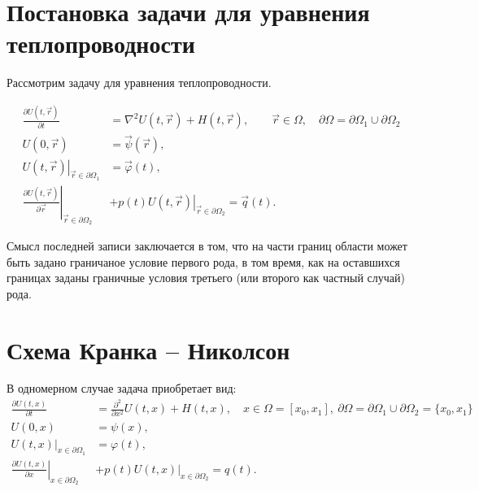 \documentclass[a4paper,12pt]{article}
\begin{document}
\renewcommand{\contentsname}{Содержание}
\renewcommand{\figurename}{Рис.}
\renewcommand{\bibname}{Список литературы}
\renewcommand{\refname}{Список литературы}
\renewcommand{\tablename}{Таблица}

\section{Постановка задачи для уравнения теплопроводности}
\label{sec:problem}

Рассмотрим задачу для уравнения теплопроводности.

\begin{align}
  \frac{\partial U(t,\vec r)}{\partial t} &= \nabla^2 U(t,\vec r) + H(t, \vec r),
    \qquad \vec r \in \Omega,
    \quad \partial \Omega = \partial \Omega_1 \cup \partial \Omega_2 \\
  U(0, \vec r) &=  \vec \psi (\vec r), \\
  \left. U(t,\vec r) \right|_{\vec r \in \partial \Omega_1} &=  \vec \varphi(t), \\
  \left. \frac{ \partial U(t,\vec r) }{\partial \vec r} \right|_{\vec r \in \partial \Omega_2}& +
    p(t)\left. U(t,\vec r) \right|_{\vec r \in \partial \Omega_2}  =  \vec q(t).
\end{align}

Смысл последней записи заключается в том, что на части границ области может быть задано граничаное условие первого рода, в том время, как на оставшихся границах заданы граничные условия третьего (или второго как частный случай) рода.

\section{Схема Кранка -- Николсон}
\label{sec:heat1d}

В одномерном случае задача приобретает вид:
\begin{align}
  \label{eq:1d-problem-eq}
  \frac{\partial U(t,x)}{\partial t} &= \frac{\partial^2}{\partial x^2} U(t,x) + H(t, x),
    \quad x \in \Omega = [x_0,x_1], \ \partial \Omega = \partial \Omega_1 \cup \partial \Omega_2 = \{x_0, x_1\}\\
  \label{eq:1d-problem-ic}
  U(0, x) &= \psi(x), \\
  \label{eq:1d-problem-bc1}
  \left. U(t,x) \right|_{x \in \partial \Omega_1} &=  \varphi(t), \\
  \label{eq:1d-problem-bc3}
  \left. \frac{ \partial U(t,x) }{\partial x} \right|_{x \in \partial \Omega_2}& +
    p(t)\left. U(t,x) \right|_{x \in \partial \Omega_2}  = q(t).
\end{align}
\end{document}
